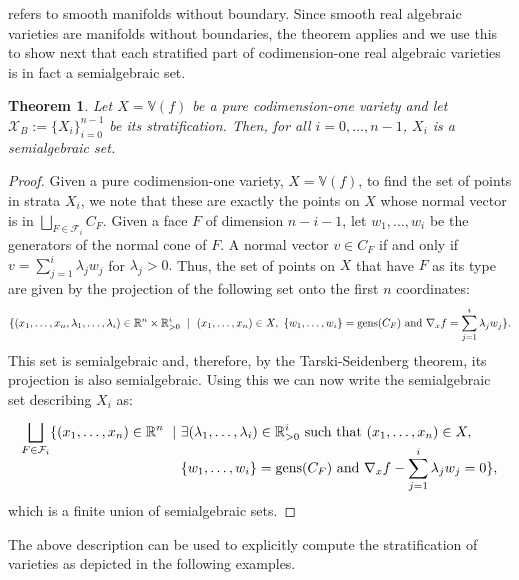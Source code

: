 \documentclass{article}
\newtheorem{theorem}{Theorem}
\numberwithin{theorem}{section}
\theoremstyle{definition}
\theoremstyle{example_contd}
\newcommand{\F}{\mathcal{F}}
\newcommand{\RR}{\mathbb{R}}
\newcommand{\V}{{\mathbb{V}}}
\begin{document}
  refers to smooth manifolds without boundary. Since smooth real algebraic varieties are manifolds without boundaries, the theorem applies and we use this to show next that each stratified part of codimension-one real algebraic varieties is in fact a semialgebraic set. 

\begin{theorem}
    Let $X=\V(f)$ be a pure codimension-one variety and let $\mathcal{X}_B:=\{X_i\}_{i=0}^{n-1}$ be its stratification. Then, for all $i = 0,\ldots, n-1$, $X_i$ is a semialgebraic set.
\end{theorem}

\begin{proof}
Given a pure codimension-one variety, $X=\V(f)$, to find the set of 
points in strata $X_i$, we note that these are exactly the points on $X$ whose normal vector is in $\bigsqcup_{F\in\F_i}C_F.$ 
Given a face $F$ of dimension $n-i-1$, let $w_1,\ldots, w_i$ be the generators of the normal cone of $F$. A normal vector $v\in C_F$ if and only if $v=\sum_{j=1}^i\lambda_jw_j$ for $\lambda_j>0.$
Thus, the set of points on $X$ that have $F$ as its type are given by the projection of the following set onto the first $n$ coordinates: 
\begin{align*}
\{(x_1,\ldots,x_n,\lambda_1,\ldots,\lambda_i)\in \RR^n\times \RR^i_{> 0} ~\mid~ (x_1,\ldots,x_n) \in X ,~ \{w_1,\ldots,w_i\}= {\rm gens}(C_F) \text{ and } \nabla_xf =\sum_{j=1}^i\lambda_jw_j \}.
\end{align*}
This set is semialgebraic and, therefore, by the Tarski-Seidenberg theorem, its projection is also semialgebraic. Using this we can now write the semialgebraic set describing $X_i$ as:

\begin{align*}\smash{\bigsqcup_{F\in \F_i}} \{(x_1,\ldots,x_n)\in \RR^n ~\mid~ &\exists (\lambda_1,\ldots,\lambda_i)\in \RR^i_{> 0} \text{ such that }(x_1,\ldots,x_n) \in X , \\ & \{w_1,\ldots,w_i\}= {\rm gens}(C_F) \text{ and } \nabla_xf -\sum_{j=1}^i\lambda_jw_j=0 \},\end{align*}
which is a finite union of semialgebraic sets.
\end{proof}

The above description can be used to explicitly compute the stratification of varieties as depicted in the following examples.
\end{document}
